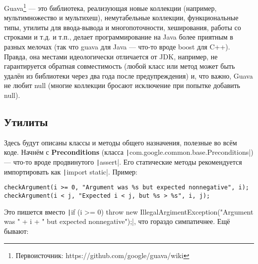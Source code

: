 \documentclass[a5paper,draft]{article}
\begin{document}
Guava\footnote{Первоисточник: https://github.com/google/guava/wiki} --- это библиотека, реализующая новые коллекции (например, мультимножество и мультихеш), немутабельные коллекции, функциональные типы, утилиты для ввода-вывода и многопоточности, хеширования, работы со строками и т.д. и т.п., делает программирование на Java более приятным в разных мелочах (так что guava для Java --- что-то вроде boost для C++). Правда, она местами идеологически отличается от JDK, например, не гарантируется обратная совместимость (любой класс или метод может быть удалён из библиотеки через два года после предупреждения) и, что важно, Guava не любит null (многие коллекции бросают исключение при попытке добавить null).

\subsection{Утилиты}

Здесь будут описаны классы и методы общего назначения, полезные во всём коде. Начнём с \textbf{Preconditions} (класса \texttt|com.google.common.base.Preconditions|) --- что-то вроде продвинутого \texttt|assert|. Его статические методы рекомендуется импортировать как \texttt|import static|. Пример:

\begin{verbatim}
checkArgument(i >= 0, "Argument was %s but expected nonnegative", i);
checkArgument(i < j, "Expected i < j, but %s > %s", i, j);
\end{verbatim}

Это пишется вместо \texttt|if (i >= 0) { throw new IllegalArgimentException("Argument was " + i + " but expected nonnegative");}|, что гораздо симпатичнее. Ещё бывают:
\end{document}
